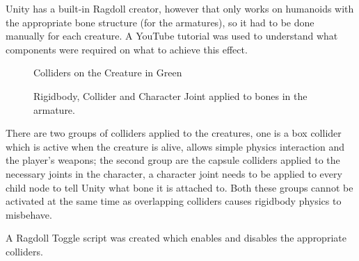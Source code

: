 \documentclass[11pt]{report}
\begin{document}
Unity has a built-in Ragdoll creator, however that only works on humanoids with the appropriate bone structure (for the armatures), so it had to be done manually for each creature. A YouTube tutorial was used to understand what components were required on what to achieve this effect. \cite{RagdollTutorial}
\begin{figure}[H]
    \begin{minipage}{.5\textwidth}
        \centering
        \caption{Colliders on the Creature in Green}
    \end{minipage}
    \begin{minipage}{.5\textwidth}
        \centering
        \caption{Rigidbody, Collider and Character Joint applied to bones in the armature.}
    \end{minipage}
\end{figure}
There are two groups of colliders applied to the creatures, one is a box collider which is active when the creature is alive, allows simple physics interaction and the player's weapons; the second group are the capsule colliders applied to the necessary joints in the character, a character joint needs to be applied to every child node to tell Unity what bone it is attached to. Both these groups cannot be activated at the same time as overlapping colliders causes rigidbody physics to misbehave.

A Ragdoll Toggle script was created which enables and disables the appropriate colliders.
\end{document}
